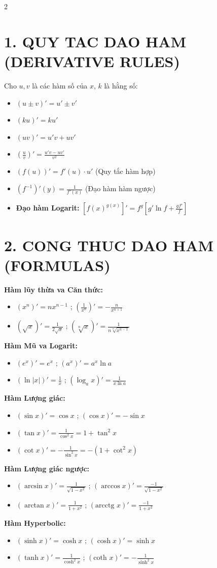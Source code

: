 \documentclass[8pt,a4paper]{article}
\begin{document}
\begin{multicols*}{2}

\section{1. QUY TAC DAO HAM (DERIVATIVE RULES)}
Cho $u, v$ là các hàm số của $x$, $k$ là hằng số:
\begin{itemize}
    \item $(u \pm v)' = u' \pm v'$
    \item $(ku)' = ku'$
    \item $(uv)' = u'v + uv'$
    \item $(\frac{u}{v})' = \frac{u'v - uv'}{v^2}$
    \item $(f(u))' = f'(u) \cdot u'$ (Quy tắc hàm hợp)
    \item $(f^{-1})'(y) = \frac{1}{f'(x)}$ (Đạo hàm hàm ngược)
    \item \textbf{Đạo hàm Logarit:} $[f(x)^{g(x)}]' = f^g [g' \ln f + \frac{gf'}{f}]$
\end{itemize}

\section{2. CONG THUC DAO HAM (FORMULAS)}
\textbf{Hàm lũy thừa va Căn thức:}
\begin{itemize}
    \item $(x^n)' = nx^{n-1}$ ; $(\frac{1}{x^n})' = -\frac{n}{x^{n+1}}$
    \item $(\sqrt{x})' = \frac{1}{2\sqrt{x}}$ ; $(\sqrt[n]{x})' = \frac{1}{n\sqrt[n]{x^{n-1}}}$
\end{itemize}
\textbf{Hàm Mũ va Logarit:}
\begin{itemize}
    \item $(e^x)' = e^x$ ; $(a^x)' = a^x \ln a$
    \item $(\ln|x|)' = \frac{1}{x}$ ; $(\log_a x)' = \frac{1}{x \ln a}$
\end{itemize}
\textbf{Hàm Lượng giác:}
\begin{itemize}
    \item $(\sin x)' = \cos x$ ; $(\cos x)' = -\sin x$
    \item $(\tan x)' = \frac{1}{\cos^2 x} = 1 + \tan^2 x$
    \item $(\cot x)' = -\frac{1}{\sin^2 x} = -(1 + \cot^2 x)$
\end{itemize}
\textbf{Hàm Lượng giác ngược:}
\begin{itemize}
    \item $(\arcsin x)' = \frac{1}{\sqrt{1-x^2}}$ ; $(\arccos x)' = \frac{-1}{\sqrt{1-x^2}}$
    \item $(\arctan x)' = \frac{1}{1+x^2}$ ; $(\text{arcctg } x)' = \frac{-1}{1+x^2}$
\end{itemize}
\textbf{Hàm Hyperbolic:}
\begin{itemize}
    \item $(\sinh x)' = \cosh x$ ; $(\cosh x)' = \sinh x$
    \item $(\tanh x)' = \frac{1}{\cosh^2 x}$ ; $(\text{coth } x)' = -\frac{1}{\sinh^2 x}$
\end{itemize}


\end{multicols*}
\end{document}
